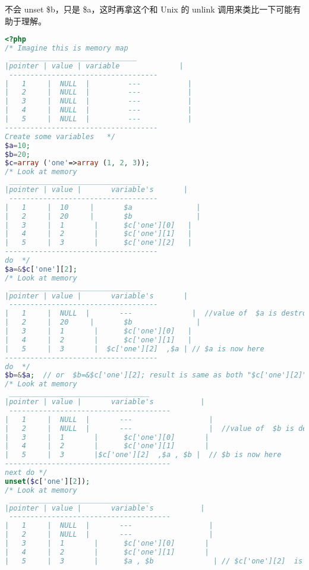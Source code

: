 不会 unset \$b，只是 \$a，这时再拿这个和 Unix 的 unlink 调用来类比一下可能有助于理解。

\begin{lstlisting}[language=PHP]
<?php
/* Imagine this is memory map
 ______________________________
|pointer | value | variable              |
 -----------------------------------
|   1     |  NULL  |         ---           |
|   2     |  NULL  |         ---           |
|   3     |  NULL  |         ---           |
|   4     |  NULL  |         ---           |
|   5     |  NULL  |         ---           |
------------------------------------
Create some variables   */
$a=10;
$b=20;
$c=array ('one'=>array (1, 2, 3));
/* Look at memory
 _______________________________
|pointer | value |       variable's       |
 -----------------------------------
|   1     |  10     |       $a               |
|   2     |  20     |       $b               |
|   3     |  1       |      $c['one'][0]   |
|   4     |  2       |      $c['one'][1]   |
|   5     |  3       |      $c['one'][2]   |
------------------------------------
do  */
$a=&$c['one'][2];
/* Look at memory
 _______________________________
|pointer | value |       variable's       |
 -----------------------------------
|   1     |  NULL  |       ---              |  //value of  $a is destroyed and pointer is free
|   2     |  20     |       $b               |
|   3     |  1       |      $c['one'][0]   |
|   4     |  2       |      $c['one'][1]   |
|   5     |  3       |  $c['one'][2]  ,$a | // $a is now here
------------------------------------
do  */
$b=&$a;  // or  $b=&$c['one'][2]; result is same as both "$c['one'][2]" and "$a" is at same pointer.
/* Look at memory
 _________________________________
|pointer | value |       variable's           |
 --------------------------------------
|   1     |  NULL  |       ---                  |  
|   2     |  NULL  |       ---                  |  //value of  $b is destroyed and pointer is free
|   3     |  1       |      $c['one'][0]       |
|   4     |  2       |      $c['one'][1]       |
|   5     |  3       |$c['one'][2]  ,$a , $b |  // $b is now here
---------------------------------------
next do */
unset($c['one'][2]);
/* Look at memory
 _________________________________
|pointer | value |       variable's           |
 --------------------------------------
|   1     |  NULL  |       ---                  |  
|   2     |  NULL  |       ---                  |  
|   3     |  1       |      $c['one'][0]       |
|   4     |  2       |      $c['one'][1]       |
|   5     |  3       |      $a , $b              | // $c['one'][2]  is  destroyed not in memory, not in array

\end{lstlisting}
